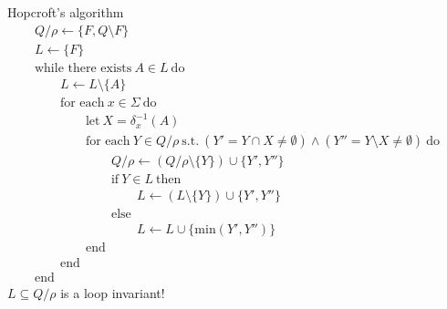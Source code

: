 \documentclass{beamer}
\begin{document}
\begin{frame}{Hopcroft's algorithm}
  \footnotesize
  \[
    \begin{array}{l}
      Q/\rho \leftarrow \{ F, Q \setminus F \} \\
      L \leftarrow \{ F \} \\
      \text{while there exists} \ A \in L \ \text{do} \\
      \qquad L \leftarrow L \setminus \{A\} \\
      \qquad \text{for each} \ x \in \Sigma \ \text{do} \\
      \qquad \qquad \text{let} \ X = \delta_x^{-1}(A) \\
      \qquad \qquad \text{for each} \ Y \in Q/\rho \ \text{s.t.} \
          (Y' = Y \cap X \neq \emptyset) \wedge (Y'' = Y \setminus X \neq \emptyset) \ \text{do} \\
      \qquad \qquad \qquad Q/\rho \leftarrow (Q/\rho \setminus \{Y\}) \cup \{Y', Y''\} \\
      \qquad \qquad \qquad \text{if} \ Y \in L \ \text{then} \\
      \qquad \qquad \qquad \qquad L \leftarrow (L \setminus \{Y\}) \cup \{Y', Y''\} \\
      \qquad \qquad \qquad \text{else} \\
      \qquad \qquad \qquad \qquad L \leftarrow L \cup \{ \text{min}(Y', Y'') \} \\
      \qquad \qquad \text{end} \\
      \qquad \text{end} \\
      \text{end}
    \end{array}
  \]
  \pause
  \color{blue} \(L \subseteq Q/\rho\) is a loop invariant!
\end{frame}
\end{document}
